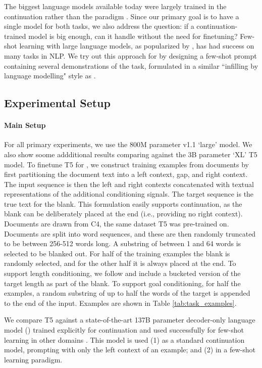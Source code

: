 The biggest language models available today were largely trained in the continuation rather than the \FitB{} paradigm \citep{gpt3,gpt-neo}.
Since our primary goal is to have a single model for both tasks, we also address the question: if a continuation-trained model is big enough, can it handle \FitB{} without the need for finetuning?
Few-shot learning with large language models, as popularized by \citet{gpt3}, has had success on many tasks in NLP.
We try out this approach for \FitB{} by designing a few-shot prompt containing several demonstrations of the \FitB{} task, formulated in a similar ``infilling by language modelling" style as \citet{donahue2020enabling}.

\subsection{Experimental Setup}
\paragraph{Main Setup}
For all primary experiments, we use the 800M parameter v1.1 `large' model.
We also show soome addditional results comparing against the 3B parameter `XL' T5 model.
To finetune T5 for \FitB, we construct training examples from documents by first partitioning the document text into a left context, gap, and right context.
The input sequence is then the left and right contexts concatenated with textual representations of the additional conditioning signals.
The target sequence is the true text for the blank.
This formulation easily supports continuation, as the blank can be deliberately placed at the end (i.e., providing no right context).
Documents are drawn from C4, the same dataset T5 was pre-trained on.
Documents are split into word sequences, and these are then randomly truncated to be between 256-512 words long.
A substring of between 1 and 64 words is selected to be blanked out.
For half of the training examples the blank is randomly selected, and for the other half it is always placed at the end.
To support length conditioning, we follow \citet{roberts2020exploring} and include a bucketed version of the target length as part of the blank.
To support goal conditioning, for half the examples, a random substring of up to half the words of the target is appended to the end of the input.
Examples are shown in Table \ref{tab:task_examples}.

We compare T5 against a state-of-the-art 137B parameter decoder-only language model (\LLM{}) trained explicitly for continuation and used successfully for few-shot learning in other domains \citep{austin2021program,reif2021recipe}.
This model is used (1) as a standard continuation model, prompting with only the left context of an example; and (2) in a few-shot learning paradigm.

